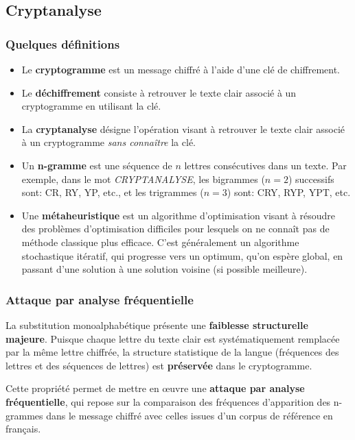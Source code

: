 \documentclass[a4paper]{article}
\begin{document}
\subsection{Cryptanalyse}

\subsubsection{Quelques définitions}

\begin{itemize}
    \item Le \textbf{cryptogramme} est un message chiffré à l'aide d'une clé de chiffrement.
    \item Le \textbf{déchiffrement} consiste à retrouver le texte clair associé à un cryptogramme en utilisant la clé.
    \item La \textbf{cryptanalyse} désigne l’opération visant à retrouver le texte clair associé à un cryptogramme \textit{sans connaître} la clé.
    \item Un \textbf{n-gramme} est une séquence de $n$ lettres consécutives dans un texte. Par exemple, dans le mot \textit{CRYPTANALYSE}, les bigrammes ($n = 2$) successifs sont: CR, RY, YP, etc., et les trigrammes ($n = 3$) sont: CRY, RYP, YPT, etc.
    \item Une \textbf{métaheuristique} est un algorithme d’optimisation visant à résoudre des problèmes d’optimisation difficiles pour lesquels on ne connaît pas de méthode classique plus efficace. C'est généralement un algorithme stochastique itératif, qui
    progresse vers un optimum, qu'on espère global, en passant d'une solution à une solution voisine (si possible meilleure).
\end{itemize}

\subsubsection{Attaque par analyse fréquentielle}

La substitution monoalphabétique présente une \textbf{faiblesse structurelle majeure}. Puisque chaque lettre du texte clair est systématiquement remplacée par la même lettre chiffrée, la structure statistique de la langue (fréquences des lettres et des séquences de lettres) est \textbf{préservée} dans le cryptogramme.

Cette propriété permet de mettre en œuvre une \textbf{attaque par analyse fréquentielle}, qui repose sur la comparaison des fréquences d’apparition des n-grammes dans le message chiffré avec celles issues d’un corpus de référence en français.
\end{document}
